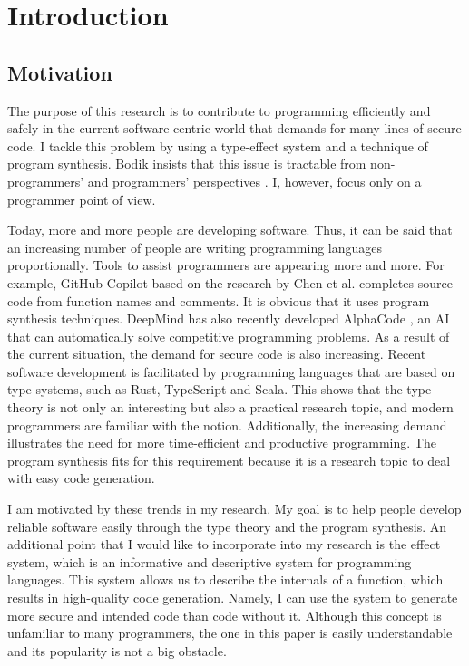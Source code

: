 \documentclass[12pt, a4paper, titlepage]{report}
\begin{document}
\chapter{Introduction}\label{chapter:introduction}
  \section{Motivation}
    The purpose of this research is to contribute to programming efficiently and safely in the current software-centric world that demands for many lines of secure code.
    I tackle this problem by using a type-effect system and a technique of program synthesis.
    Bodik insists that this issue is tractable from non-programmers' and programmers' perspectives \cite{bodik:2015}.
    I, however, focus only on a programmer point of view.

    Today, more and more people are developing software.
    Thus, it can be said that an increasing number of people are writing programming languages proportionally.
    Tools to assist programmers are appearing more and more.
    For example, GitHub Copilot based on the research by Chen et al. \cite{Chen:2021} completes source code from function names and comments.
    It is obvious that it uses program synthesis techniques.
    DeepMind has also recently developed AlphaCode \cite{Li:2022}, an AI that can automatically solve competitive programming problems.
    As a result of the current situation, the demand for secure code is also increasing.
    Recent software development is facilitated by programming languages that are based on type systems, such as Rust, TypeScript and Scala.
    This shows that the type theory is not only an interesting but also a practical research topic, and modern programmers are familiar with the notion.
    Additionally, the increasing demand illustrates the need for more time-efficient and productive programming.
    The program synthesis fits for this requirement because it is a research topic to deal with easy code generation.

    I am motivated by these trends in my research.
    My goal is to help people develop reliable software easily through the type theory and the program synthesis.
    An additional point that I would like to incorporate into my research is the effect system, which is an informative and descriptive system for programming languages.
    This system allows us to describe the internals of a function, which results in high-quality code generation.
    Namely, I can use the system to generate more secure and intended code than code without it.
    Although this concept is unfamiliar to many programmers, the one in this paper is easily understandable and its popularity is not a big obstacle.
\end{document}
